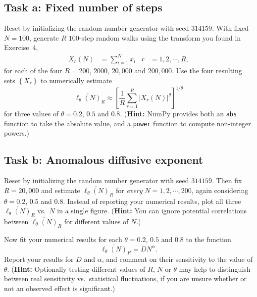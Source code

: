 \documentclass[12 pt]{article} %
\newcommand{\al}{\ensuremath{\alpha} }
\newcommand{\showmarks}[1]{\rightline{\texttt{[#1 marks]}}} %
\begin{document}
\newpage %
\subsection*{Task a: Fixed number of steps}
Reset by initializing the random number generator with seed $314159$. %
With fixed $N = 100$, generate $R$ $100$-step random walks using the transform you found in Exercise~4,
\begin{align*}
  X_r(N) & = \sum_{i = 1}^N x_i &
  r & = 1, 2, \cdots, R,
\end{align*}
for each of the four $R = 200$, $2000$, $20{,}000$ and $200{,}000$.
Use the four resulting sets $\left\{X_r\right\}$ to numerically estimate
\begin{equation*}
  \overline{\ell_{\theta}(N)}_R \approx \left[\frac{1}{R} \sum_{r = 1}^R \left|X_r(N)\right|^{\theta}\right]^{1 / \theta}
\end{equation*}
for three values of $\theta = 0.2$, $0.5$ and $0.8$.
(\textbf{Hint:} NumPy provides both an \texttt{abs} function to take the absolute value, and a \texttt{power} function to compute non-integer powers.)

\showmarks{12}

\subsection*{Task b: Anomalous diffusive exponent}
Reset by initializing the random number generator with seed $314159$. %
Then fix $R = 20{,}000$ and estimate $\overline{\ell_{\theta}(N)}_R$ for \textit{every} $N = 1, 2, \cdots, 200$, again considering $\theta = 0.2$, $0.5$ and $0.8$.
Instead of reporting your numerical results, plot all three $\overline{\ell_{\theta}(N)}_R$ vs.\ $N$ in a single figure.
(\textbf{Hint:} You can ignore potential correlations between $\overline{\ell_{\theta}(N)}_R$ for different values of $N$.)

\showmarks{8}

Now fit your numerical results for each $\theta = 0.2$, $0.5$ and $0.8$ to the function
\begin{equation*}
  \overline{\ell_{\theta}(N)}_R = D N^{\al}.
\end{equation*}
Report your results for $D$ and $\al$, and comment on their sensitivity to the value of $\theta$.
(\textbf{Hint:} Optionally testing different values of $R$, $N$ or $\theta$ may help to distinguish between real sensitivity vs.\ statistical fluctuations, if you are unsure whether or not an observed effect is significant.)

\showmarks{10}



\end{document}
